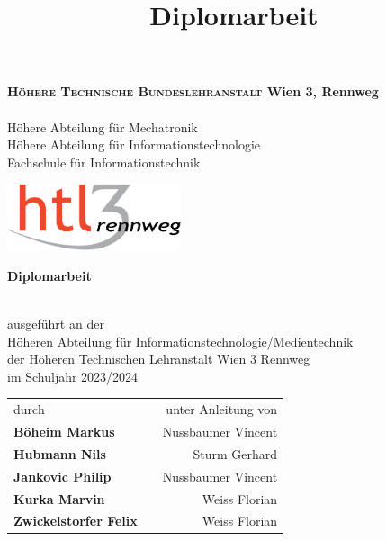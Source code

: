 \documentclass[
    headings=optiontotocandhead,%
    twoside,
    numbers=noenddot,%
    toc=flat, %
    12pt, %
    titlepage, %
    parskip=full, %
    listof=totoc, %
    listof=flat, %
    numbers=noenddot, %
    bibliography=totoc, %
    a4paper,DIV=14,
    BCOR=15mm,
]{scrbook}
\begin{document}
\newcommand{\kapitelautor}{}




\frontmatter %
\title{Diplomarbeit}

\begin{titlepage}
\begin{minipage}[b]{1\columnwidth}
\parbox[b]{99mm}{
\begin{TitlePageBox}
\footnotesize%
\textsf{%
\textbf{\textsc{Höhere Technische Bundeslehranstalt} Wien 3, Rennweg}\\
\\
Höhere Abteilung für Mechatronik\\
Höhere Abteilung für Informationstechnologie\\
Fachschule für Informationstechnik}
\end{TitlePageBox}
}\hfill\parbox[b]{50mm}{\includegraphics[width=51mm]{HTL3RLogoRGB}}
\mbox{}
\end{minipage}

\vspace{1cm}


\begin{center}

\textbf{\LARGE{}Diplomarbeit}{\large{}}\\
{\large{}\vspace{15mm}
 }
\textbf{\large{}\FF}\\

 \vfill

 ausgeführt an der\\
 Höheren Abteilung für Informationstechnologie/Medientechnik\\
 der Höheren Technischen Lehranstalt Wien 3 Rennweg\\

 \vfill
 im Schuljahr 2023/2024\\

\vspace{1cm}

{
\renewcommand{\arraystretch}{1.8}
\begin{tabular}{l c r}
durch  & \hfill & unter Anleitung von \\
\textbf{\large{}Böheim Markus} && Nussbaumer Vincent \\
\textbf{\large{}Hubmann Nils} && Sturm Gerhard \\
\textbf{\large{}Jankovic Philip} && Nussbaumer Vincent \\
\textbf{\large{}Kurka Marvin} && Weiss Florian \\
\textbf{\large{}Zwickelstorfer Felix} && Weiss Florian \\
\end{tabular}
}


\end{center}
\end{titlepage}
\end{document}
